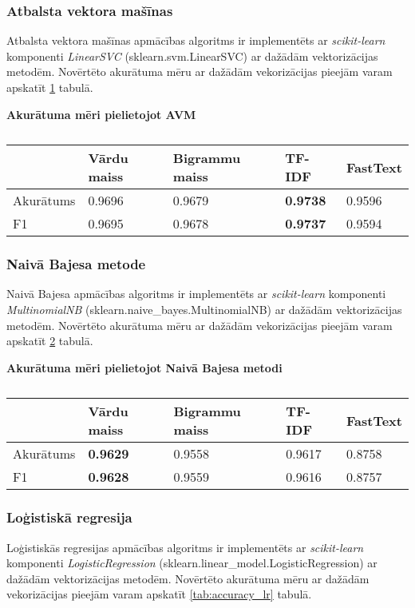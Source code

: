 \subsubsection{Atbalsta vektora mašīnas}
Atbalsta vektora mašīnas apmācības algoritms ir implementēts ar \textit{scikit-learn} komponenti \textit{LinearSVC} (sklearn.svm.LinearSVC) ar dažādām vektorizācijas metodēm. Novērtēto akurātuma mēru ar dažādām vekorizācijas pieejām varam apskatīt \ref{tab:accuracy_svm} tabulā.
\begin{table}[H]
\centering
\caption{\label{tab:accuracy_svm}}
\textbf{Akurātuma mēri pielietojot AVM\\}
\begin{tabular}{|l||l|l|l|l|}
\hline
& Vārdu maiss & Bigrammu maiss & TF-IDF & FastText \\ \hline
Akurātums & 0.9696 & 0.9679 & \textbf{0.9738} & 0.9596 \\ \hline
F1 & 0.9695 & 0.9678 & \textbf{0.9737} & 0.9594 \\ \hline
\end{tabular}
\end{table}

\subsubsection{Naivā Bajesa metode}
Naivā Bajesa apmācības algoritms ir implementēts ar \textit{scikit-learn} komponenti \textit{MultinomialNB} (sklearn.naive\_bayes.MultinomialNB) ar dažādām vektorizācijas metodēm. Novērtēto akurātuma mēru ar dažādām vekorizācijas pieejām varam apskatīt \ref{tab:accuracy_nb} tabulā.
\begin{table}[H]
\centering
\caption{\label{tab:accuracy_nb}}
\textbf{Akurātuma mēri pielietojot Naivā Bajesa metodi\\}
\begin{tabular}{|l||l|l|l|l|}
\hline
& Vārdu maiss & Bigrammu maiss & TF-IDF & FastText \\ \hline
Akurātums & \textbf{0.9629} & 0.9558 & 0.9617 & 0.8758 \\ \hline
F1 & \textbf{0.9628} & 0.9559 & 0.9616 & 0.8757 \\ \hline
\end{tabular}
\end{table}

\subsubsection{Loģistiskā regresija}
Loģistiskās regresijas apmācības algoritms ir implementēts ar \textit{scikit-learn} komponenti \textit{LogisticRegression} (sklearn.linear\_model.LogisticRegression) ar dažādām vektorizācijas metodēm. Novērtēto akurātuma mēru ar dažādām vekorizācijas pieejām varam apskatīt \ref{tab:accuracy_lr} tabulā.

